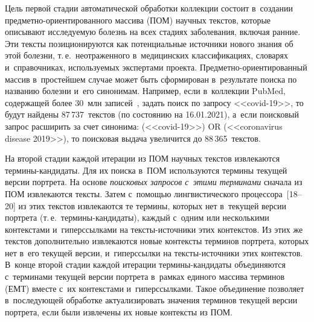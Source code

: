 \begin{multicols}{2}
  Цель первой стадии автоматической обработки коллекции состоит 
в~создании пред\-мет\-но-ори\-ен\-ти\-ро\-ван\-но\-го массива (ПОМ) 
научных текстов, которые описывают исследуемую болезнь на всех стадиях 
заболевания, включая ранние. Эти тексты позиционируются как 
потенциальные источники нового знания об этой болезни, т.\,е.\ 
неотраженного в~медицинских классификациях, словарях и~справочниках, 
используемых экспертами проекта. Пред\-мет\-но-ори\-ен\-ти\-ро\-ван\-ный массив в~прос\-тей\-шем случае может быть 
сформирован в~результате поиска по названию болезни и~его синонимам. 
Например, если в~коллекции PubMed, содержащей более 30~млн 
записей~\cite{10-z}, задать поиск по запросу <<covid-19>>, то будут найдены 
87\,737~текстов (по состоянию на 16.01.2021), а~если поисковый запрос 
расширить за счет синонима: (<<covid-19>>) OR (<<coronavirus disease 
2019>>), то поисковая выдача увеличится до 88\,365~текстов.
  
  На второй стадии каждой итерации из ПОМ научных текстов извлекаются 
тер\-ми\-ны-кан\-ди\-да\-ты. Для их поиска в~ПОМ используются термины 
текущей версии портрета. На основе \textit{поисковых запросов с~этими 
терминами} сначала из ПОМ извлекаются тексты. Затем с~по\-мощью 
лингвистического процессора~[18--20] из этих текс\-тов извлекаются те 
термины, которых нет в~текущей версии портрета (т.\,е.\  
тер\-ми\-ны-кан\-ди\-да\-ты), каждый с~одним или несколькими контекстами 
и~гиперссылками на текс\-ты-ис\-точ\-ни\-ки этих контекстов. Из этих же 
текс\-тов дополнительно извлекаются новые кон\-текс\-ты терминов портрета, 
которых нет в~его текущей версии, и~гиперссылки на текс\-ты-ис\-точ\-ни\-ки 
этих контекстов. В~конце второй стадии каж\-дой итерации  
тер\-ми\-ны-кан\-ди\-да\-ты объединяются с~терминами текущей версии 
портрета в~рамках единого массива терминов (ЕМТ) вмес\-те с~их контекстами 
и~гиперссылками. Такое объединение позволяет в~по\-сле\-ду\-ющей обработке 
актуализировать значения терминов текущей версии портрета, если были 
извлечены их новые контексты из ПОМ.

\begin{table*}[b]\small %
\begin{center}
\vspace*{2ex}


\end{center}
\end{table*}
\end{multicols}
